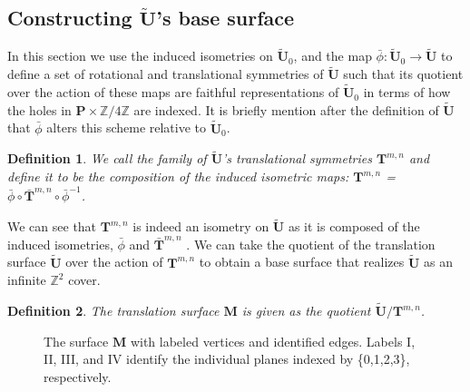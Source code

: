 \documentclass[]{article}
\newtheorem{Def}{Definition}[subsection]
\begin{document}

\subsection{Constructing $\tilde{\mathbf{U}}$'s base surface}
In this section we use the induced isometries on $\tilde{\mathbf{U}}_0$, and the map $\bar{\phi}:\tilde{\mathbf{U}}_0\rightarrow\tilde{\mathbf{U}}$ to define a set of rotational and translational symmetries of $\tilde{\mathbf{U}}$ such that its quotient over the action of these maps are faithful representations of $\tilde{\mathbf{U}}_0$ in terms of how the holes in $\mathbf{P}\times\mathbb{Z}/4\mathbb{Z}$ are indexed. It is briefly mention after the definition of $\tilde{\mathbf{U}}$ that $\bar{\phi}$ alters this scheme relative to $\tilde{\mathbf{U}}_0$. 

\begin{Def}We call the {family of $\tilde{\mathbf{U}}$'s translational symmetries} $\mathbf{T}^{m,n}$ and define it to be the composition of the induced isometric maps: $\mathbf{T}^{m,n}$ = $\bar{\phi}\circ\bar{\mathbf{T}}^{m,n}\circ\bar{\phi}^{-1}$.
\end{Def}

We can see that $\mathbf{T}^{m,n}$ is indeed an isometry on $\tilde{\mathbf{U}}$ as it is composed of the induced isometries, $\bar{\phi}$ and $\bar{\mathbf{T}}^{m,n}$ . We can take the quotient of the translation surface $\tilde{\mathbf{U}}$ over the action of $\mathbf{T}^{m,n}$ to obtain a base surface that realizes $\tilde{\mathbf{U}}$ as an infinite $\mathbb{Z}^2$ cover.

\begin{Def}
The translation surface $\mathbf{M}$ is given as the quotient  $\tilde{\mathbf{U}}/\mathbf{T}^{m,n}$.
\end{Def} 

\begin{figure}[H]
\centering

\caption{The surface $\mathbf{M}$ with labeled vertices and identified edges. Labels I, II, III, and IV identify the individual planes indexed by \{0,1,2,3\}, respectively.}
\label{fig:mtilda}
\end{figure}
\end{document}
